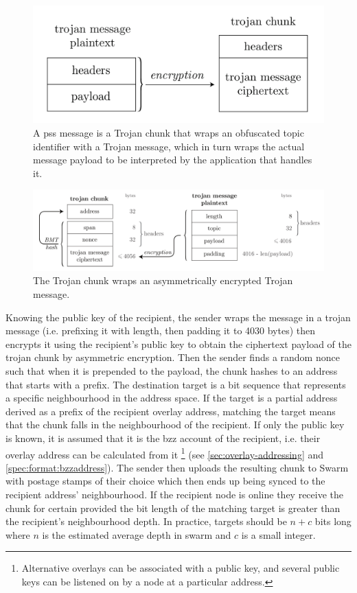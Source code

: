 \begin{figure}[htbp]
\centering
\includegraphics[width=.6\textwidth]{fig/trojan-generic.pdf}
\caption[Trojan chunk or pss message\statusgreen]{A pss message is a Trojan chunk that wraps an obfuscated topic identifier with a Trojan message, which in turn wraps the actual message payload to be interpreted by the application that handles it.}
\label{fig:trojan-generic}
\end{figure}

\begin{figure}[htbp]
\centering
\includegraphics[width=\textwidth]{fig/trojan-chunk-3.pdf}
\caption[Trojan chunk\statusgreen]{The Trojan chunk wraps an asymmetrically encrypted Trojan message.}
\label{fig:trojan-chunk}
\end{figure}

Knowing the public key of the recipient, the sender wraps the message in a trojan message (i.e. prefixing it with length, then padding it to 4030 bytes) then encrypts it using the recipient's public key to obtain the ciphertext payload of the trojan chunk by asymmetric encryption. Then the sender finds a random nonce such that when it is prepended to the payload, the chunk hashes to an address that starts with a  prefix. The destination target is a bit sequence that represents a specific neighbourhood in the address space. If the target is a partial address derived as a prefix of the recipient overlay address, matching the target means that the chunk falls in the neighbourhood of the recipient. If only the public key is known, it is assumed that it is the bzz account of the recipient, i.e. their overlay address can be calculated from it%
%
\footnote{Alternative overlays can be associated with a public key, and several public keys can be listened on by a node at a particular address.}
%
(see \ref{sec:overlay-addressing} and \ref{spec:format:bzzaddress}). The sender then uploads the resulting chunk to Swarm with postage stamps of their choice which then ends up being synced to the recipient address' neighbourhood. If the recipient node is online they receive the chunk for certain provided the bit length of the matching target is greater than the recipient's neighbourhood depth. In practice, targets should be $n+c$ bits long where $n$ is the estimated average depth in swarm and $c$ is a small integer. 

